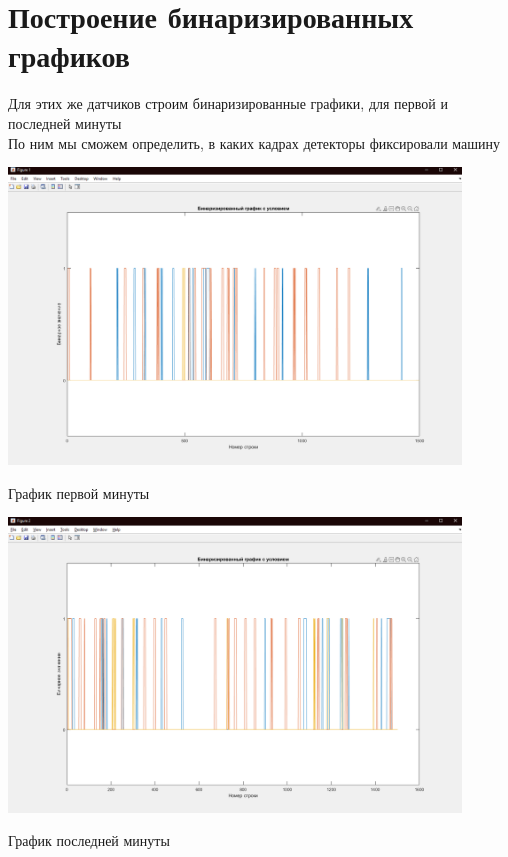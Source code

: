 \documentclass[a4paper,12pt]{article}
\begin{document}
\newpage
\section*{Построение бинаризированных графиков}
Для этих же датчиков строим бинаризированные графики, для первой и последней минуты\\
По ним мы сможем определить, в каких кадрах детекторы фиксировали машину
\begin{center}
\includegraphics[width=0.9\textwidth]{images/binary_first.png}
\end{center}
\begin{center}
График первой минуты
\end{center}
\begin{center}
\includegraphics[width=0.9\textwidth]{images/binary_last.png}
\end{center}
\begin{center}
График последней минуты 
\end{center}
\end{document}
